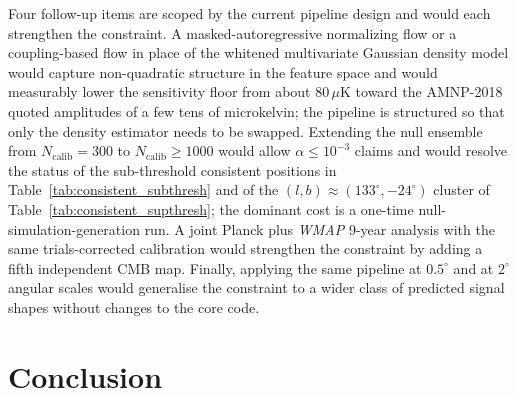 \documentclass[11pt,a4paper]{article}
\begin{document}
Four follow-up items are scoped by the current pipeline design and would each strengthen the constraint. A masked-autoregressive normalizing flow \citep{papamakarios_2017} or a coupling-based flow \citep{dinh_2016} in place of the whitened multivariate Gaussian density model would capture non-quadratic structure in the feature space and would measurably lower the sensitivity floor from about $80\,\mu\mathrm{K}$ toward the AMNP-2018 quoted amplitudes of a few tens of microkelvin; the pipeline is structured so that only the density estimator needs to be swapped. Extending the null ensemble from $N_{\text{calib}} = 300$ to $N_{\text{calib}} \ge 1000$ would allow $\alpha \le 10^{-3}$ claims and would resolve the status of the sub-threshold consistent positions in Table~\ref{tab:consistent_subthresh} and of the $(l, b) \approx (133^\circ, -24^\circ)$ cluster of Table~\ref{tab:consistent_supthresh}; the dominant cost is a one-time null-simulation-generation run. A joint Planck plus \emph{WMAP} 9-year \citep{bennett_2013} analysis with the same trials-corrected calibration would strengthen the constraint by adding a fifth independent CMB map. Finally, applying the same pipeline at $0.5^\circ$ and at $2^\circ$ angular scales would generalise the constraint to a wider class of predicted signal shapes without changes to the core code.

\section{Conclusion}\label{sec:conclusion}
\end{document}

